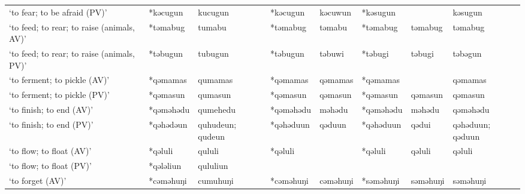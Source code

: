 \begin{landscape}
\begin{longtable}[c]{@{}p{3cm}<{\raggedright}p{2.75cm}<{\raggedright}p{2.75cm}<{\raggedright}p{2.75cm}<{\raggedright}p{2.75cm}<{\raggedright}p{2.75cm}<{\raggedright}p{2.75cm}<{\raggedright}p{2.75cm}<{\raggedright}@{}}
`to fear; to be afraid (PV)'                         & *kəcugun     & kucugun                       & *kəcugun       & kəcuwun                    & *kəsugun         &                          & kəsugun                           \\
`to feed; to rear; to raise (animals, AV)'           & *təmabug     & tumabu                        & *təmabug       & təmabu                     & *təmabug         & təmabug                  & təmabug                           \\
`to feed; to rear; to raise (animals, PV)'           & *təbugun     & tubugun                       & *təbugun       & təbuwi                     & *təbugi          & təbugi                   & təbəgun                           \\
`to ferment; to pickle (AV)'                         & *qəmamas     & qumamas                       & *qəmamas       & qəmamas                    & *qəmamas         &                          & qəmamas                           \\
`to ferment; to pickle (PV)'                         & *qəmasun     & qumasun                       & *qəmasun       & qəmasun                    & *qəmasun         & qəmasun                  & qəmasun                           \\
`to finish; to end (AV)'                             & *qəməhədu    & qumehedu                      & *qəməhədu      & məhədu                     & *qəməhədu        & məhədu                   & qəməhədu                          \\
`to finish; to end (PV)'                             & *qəhədəun    & quhudeun; qudeun              & *qəhəduun      & qəduun                     & *qəhəduun        & qədui                    & qəhəduun; qəduun                  \\
`to flow; to float (AV)'                             & *qəluli      & qululi                        & *qəluli        &                            & *qəluli          & qəluli                   & qəluli                            \\
`to flow; to float (PV)'                             & *qələliun    & qululiun                      &                &                            &                  &                          &                                   \\
`to forget (AV)'                                     & *cəməhuŋi    & cumuhuŋi                      & *cəməhuŋi      & cəməhuŋi                   & *səməhuŋi        & səməhuŋi                 & səməhuŋi                          \\

\end{longtable}
\end{landscape}

